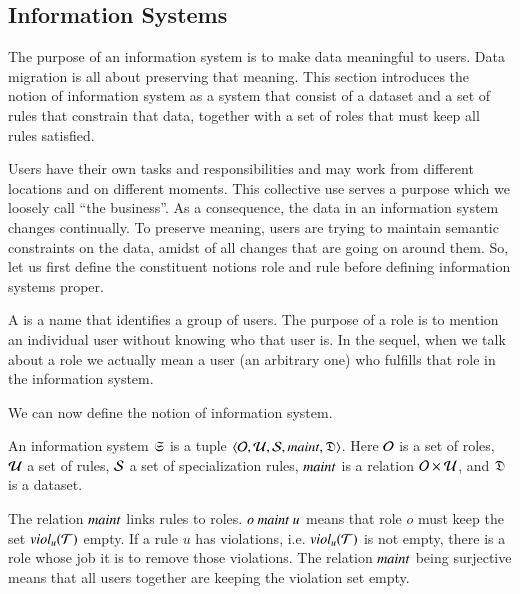 \documentclass{elsarticle}
\begin{document}
\subsection{Information Systems}
\label{sct:Information Systems}
   The purpose of an information system is to make data meaningful to users.
   Data migration is all about preserving that meaning.
   This section introduces the notion of information system
   as a system that consist of a dataset and a set of rules that constrain that data,
   together with a set of roles that must keep all rules satisfied.

   Users have their own tasks and responsibilities
   and may work from different locations and on different moments.
   This collective use serves a purpose which we loosely call ``the business''.
   As a consequence, the data in an information system changes continually.
   To preserve meaning, users are trying to maintain semantic constraints on the data,
   amidst of all changes that are going on around them.
   So, let us first define the constituent notions role and rule before defining information systems proper.

   A  is a name that identifies a group of users.
   The purpose of a role is to mention an individual user without knowing who that user is.
   In the sequel, when we talk about a role we actually mean a user (an arbitrary one) who fulfills that role in the information system.
   

   We can now define the notion of information system.
\begin{definition}
\label{def:information system}
\item An information system $\mathfrak{S}$ is a tuple $\langle\mathcal{O},\mathcal{U},\mathcal{S},\text{\it maint\/},\mathfrak{D}\rangle$.
   Here $\mathcal{O}$ is a set of roles,
   $\mathcal{U}$ a set of rules,
   $\mathcal{S}$ a set of specialization rules,
   $\text{\it maint\/}$ is a relation $\mathcal{O}\times\mathcal{U}$,
   and $\mathfrak{D}$ is a dataset.
\end{definition}
   The relation $\text{\it maint\/}$ links rules to roles.
   $o\ \text{\it maint\/}\ u$ means that role $o$ must keep the set $\text{\it viol\/}_{u}(\mathcal{T})$ empty.
   If a rule $u$ has violations, i.e. $\text{\it viol\/}_{u}(\mathcal{T})$ is not empty, there is a role whose job it is to remove those violations.
   The relation $\text{\it maint\/}$ being surjective means that all users together are keeping the violation set empty.
\end{document}
